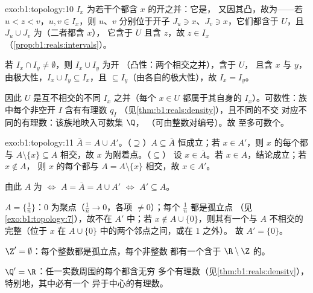 \begin{solution}{exo:b1:topology:10}
$I_x$ 为若干个都含 $x$ 的开之并：它是，
又因其凸，故为——若 $u < z < v$，$u, v \in
I_x$，则 $u$、$v$ 分别位于开子 $J_u \ni x$、$J_v \ni
x$，它们都含于 $U$，且 $J_u \cup J_v$ 为（二者都含 $x$），
它含于 $U$ 且含 $z$，故 $z \in I_x$
（\cref{prop:b1:reals:intervals}）。

若 $I_x \cap I_y \neq \emptyset$，则 $I_x \cup I_y$ 为开
（凸性：两个相交之并），含于 $U$，
且含 $x$ 与 $y$，由极大性，$I_x \cup I_y \subseteq I_x$，且
$\subseteq I_y$（由各自的极大性），故 $I_x = I_y$。

因此 $U$ 是互不相交的不同 $I_x$ 之并（每个 $x \in
U$ 都属于其自身的 $I_x$）。可数性：族中每个非空开
$I$ 含有有理数 $q_I$
（见\cref{thm:b1:reals:density}），且不同的不交
对应不同的有理数：该族地映入可数集 $\Q$，
（可由整数对编号）。故
至多可数个。
\end{solution}

\begin{solution}{exo:b1:topology:11}
$\overline A = A \cup A'$。（$\supseteq$）$A \subseteq \overline
A$ 恒成立；若 $x \in A'$，则 $x$ 的每个都与 $A
\setminus \{x\} \subseteq A$ 相交，故 $x$ 为附着点。（$\subseteq$）
设 $x \in \overline A$。若 $x \in A$，结论成立；若 $x \notin A$，
则 $x$ 的每个都与 $A = A \setminus \{x\}$ 相交，故 $x \in
A'$。

由此 $A$ 为 $\iff$ $A = \overline A = A \cup A'$
$\iff$ $A' \subseteq A$。

$A = \{\frac 1n\}$：$0$ 为聚点（$\frac 1n \to
0$，各项 $\neq 0$）；每个 $\frac 1n$ 都是孤立点
（见\cref{exo:b1:topology:7}），故不在 $A'$ 中；若 $x
\notin A \cup \{0\}$，则其有一个与 $A$ 不相交的完整（位于
$x$ 在 $A \cup \{0\}$ 中的两个邻点之间，或在 $1$ 之外）。
故 $A' = \{0\}$。

$\Z' = \emptyset$：每个整数都是孤立点，每个非整数
都有一个含于 $\R \setminus \Z$ 的。

$\Q' = \R$：任一实数周围的每个都含无穷
多个有理数（见\cref{thm:b1:reals:density}），特别地，其中必有一个
异于中心的有理数。
\end{solution}

